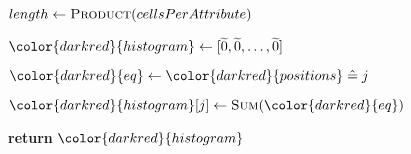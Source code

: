 \begin{algorithm}[H]
\begin{algorithmic}[1]
    \EndFor

    \State $length \gets \textsc{Product}(cellsPerAttribute)$

    \State ${\color{darkred}{histogram}} \gets [\enc{0}, \enc{0}, \dots, \enc{0}]$



      \State ${\color{darkred}{eq}} \gets {\color{darkred}{positions}} \heq j$

      \State ${\color{darkred}{histogram}}[j] \gets \textsc{Sum}({\color{darkred}{eq}})$

    \EndFor

    \State \textbf{return} {${\color{darkred}{histogram}}$}
\EndProcedure


\end{algorithmic}
\end{algorithm}
